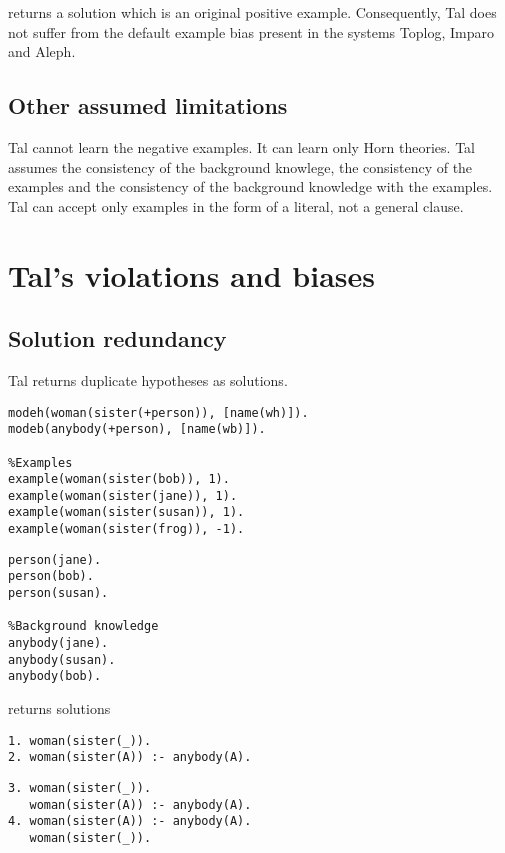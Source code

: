 returns a solution  which is an original positive example. Consequently, Tal does not suffer from the default example bias present in the systems Toplog, Imparo and Aleph.

\subsection{Other assumed limitations}
Tal cannot learn the negative examples. It can learn only Horn theories. Tal assumes the consistency of the background knowlege, the consistency of the examples and the consistency of the background knowledge with the examples. Tal can accept only examples in the form of a literal, not a general clause.

\section{Tal's violations and biases}

\subsection{Solution redundancy}
Tal returns duplicate hypotheses as solutions.

\begin{minipage}[t]{.65\textwidth}
\begin{lstlisting}
modeh(woman(sister(+person)), [name(wh)]).
modeb(anybody(+person), [name(wb)]).

%Examples
example(woman(sister(bob)), 1).
example(woman(sister(jane)), 1).
example(woman(sister(susan)), 1).
example(woman(sister(frog)), -1).
\end{lstlisting}
\end{minipage}
\begin{minipage}[t]{.20\textwidth}
\begin{lstlisting}
person(jane).
person(bob).
person(susan).

%Background knowledge
anybody(jane).
anybody(susan).
anybody(bob).
\end{lstlisting}
\end{minipage}

returns solutions

\begin{minipage}[t]{.50\textwidth}
\begin{lstlisting}
1. woman(sister(_)).
2. woman(sister(A)) :- anybody(A).
\end{lstlisting}
\end{minipage}
\begin{minipage}[t]{.20\textwidth}
\begin{lstlisting}
3. woman(sister(_)).
   woman(sister(A)) :- anybody(A).
4. woman(sister(A)) :- anybody(A).
   woman(sister(_)).
\end{lstlisting}
\end{minipage}

